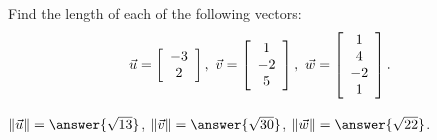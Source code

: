 \documentclass{ximera}
\author{Zack Reed}
\begin{document}
\begin{exercise}
  Find the length of each of the following vectors:
\begin{equation*}
  \vect{u}=\startmat{c}-3\\2\stopmat, \quad
  \vect{v}=\startmat{c}1\\-2\\5\stopmat, \quad
  \vect{w}=\startmat{c}1\\4\\-2\\1\stopmat.
\end{equation*}

$\norm{\vect{u}} = \answer{\sqrt{13}}$, $\norm{\vect{v}} = \answer{\sqrt{30}}$,
    $\norm{\vect{w}} = \answer{\sqrt{22}}$.

\end{exercise}
\end{document}
